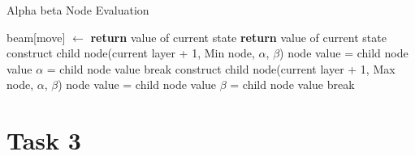 \documentclass[a4paper,12pt]{article}
\begin{document}
    \begin{algorithm}[H]
        \caption{Alpha beta Node Evaluation}
        \begin{algorithmic}
            \Statex
            \State beam[move] $\gets$ 
            \Statex
            \State \textbf{return} value of current state
            \Statex
            \State \textbf{return} value of current state
            \Statex
            \State construct child node(current layer + 1, Min node, $\alpha$, $\beta$)
            \State {}
            \State node value = child node value
            \State $\alpha$ = child node value
            \If{$\alpha \geq \beta$}
            \State break
            \EndIf
            \EndIf
            \EndFor
            \Statex
            \State construct child node(current layer + 1, Max node, $\alpha$, $\beta$)
            \State {}
            \State node value = child node value
            \State $\beta$ = child node value
            \If{$\alpha \geq \beta$}
            \State break
            \EndIf
            \EndIf
            \EndFor
            \EndIf
            \EndFunction
        \end{algorithmic}
    \end{algorithm}
    
    \section{Task 3}
    
\end{document}
